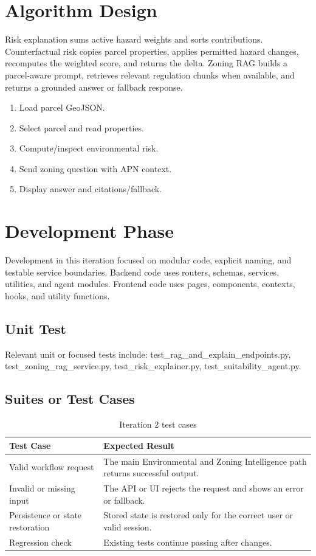 \documentclass[12pt,a4paper,oneside]{report}
\begin{document}
\section{Algorithm Design}
Risk explanation sums active hazard weights and sorts contributions. Counterfactual risk copies parcel properties, applies permitted hazard changes, recomputes the weighted score, and returns the delta. Zoning RAG builds a parcel-aware prompt, retrieves relevant regulation chunks when available, and returns a grounded answer or fallback response.
\begin{enumerate}

\item Load parcel GeoJSON.

\item Select parcel and read properties.

\item Compute/inspect environmental risk.

\item Send zoning question with APN context.

\item Display answer and citations/fallback.

\end{enumerate}

\section{Development Phase}
Development in this iteration focused on modular code, explicit naming, and testable service boundaries. Backend code uses routers, schemas, services, utilities, and agent modules. Frontend code uses pages, components, contexts, hooks, and utility functions.

\subsection{Unit Test}
Relevant unit or focused tests include: test\_rag\_and\_explain\_endpoints.py, test\_zoning\_rag\_service.py, test\_risk\_explainer.py, test\_suitability\_agent.py.

\subsection{Suites or Test Cases}
\begin{longtable}{p{}p{}}
\caption{Iteration 2 test cases}\\
\toprule
Test Case & Expected Result \\
\midrule

Valid workflow request & The main Environmental and Zoning Intelligence path returns successful output. \\

Invalid or missing input & The API or UI rejects the request and shows an error or fallback. \\
Persistence or state restoration & Stored state is restored only for the correct user or valid session. \\
Regression check & Existing tests continue passing after changes. \\
\bottomrule
\end{longtable}
\end{document}
